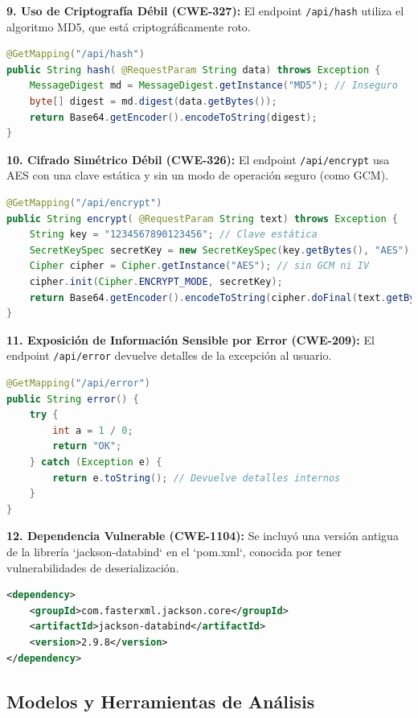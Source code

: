 \textbf{9. Uso de Criptografía Débil (CWE-327):} El endpoint \texttt{/api/hash} utiliza el algoritmo MD5, que está criptográficamente roto.
\begin{lstlisting}[language=java, caption={Uso de un algoritmo de hash débil (MD5).}]
@GetMapping("/api/hash")
public String hash( @RequestParam String data) throws Exception {
    MessageDigest md = MessageDigest.getInstance("MD5"); // Inseguro
    byte[] digest = md.digest(data.getBytes());
    return Base64.getEncoder().encodeToString(digest);
}
\end{lstlisting}

\textbf{10. Cifrado Simétrico Débil (CWE-326):} El endpoint \texttt{/api/encrypt} usa AES con una clave estática y sin un modo de operación seguro (como GCM).
\begin{lstlisting}[language=java, caption={Cifrado simétrico débil (AES con clave fija).}]
@GetMapping("/api/encrypt")
public String encrypt( @RequestParam String text) throws Exception {
    String key = "1234567890123456"; // Clave estática
    SecretKeySpec secretKey = new SecretKeySpec(key.getBytes(), "AES");
    Cipher cipher = Cipher.getInstance("AES"); // sin GCM ni IV
    cipher.init(Cipher.ENCRYPT_MODE, secretKey);
    return Base64.getEncoder().encodeToString(cipher.doFinal(text.getBytes()));
}
\end{lstlisting}

\textbf{11. Exposición de Información Sensible por Error (CWE-209):} El endpoint \texttt{/api/error} devuelve detalles de la excepción al usuario.
\begin{lstlisting}[language=java, caption={Manejo de excepciones que expone información.}]
@GetMapping("/api/error")
public String error() {
    try {
        int a = 1 / 0;
        return "OK";
    } catch (Exception e) {
        return e.toString(); // Devuelve detalles internos
    }
}
\end{lstlisting}

\textbf{12. Dependencia Vulnerable (CWE-1104):} Se incluyó una versión antigua de la librería `jackson-databind` en el `pom.xml`, conocida por tener vulnerabilidades de deserialización.
\begin{lstlisting}[language=xml, caption={Dependencia vulnerable en pom.xml.}]
<dependency>
    <groupId>com.fasterxml.jackson.core</groupId>
    <artifactId>jackson-databind</artifactId>
    <version>2.9.8</version> 
</dependency>
\end{lstlisting}

\subsection{Modelos y Herramientas de Análisis}

